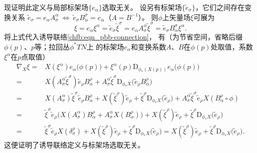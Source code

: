 现证明此定义与局部标架场$\{e_\alpha\}$选取无关。
设另有标架场$\{\tilde{e}_{\sigma}\}$，它们之间存在变换关系
$\tilde{e}_\sigma= e_\alpha A^\alpha_{\sigma} {\  \Leftrightarrow\  }
\tilde{e}_\sigma B_{\alpha}^\sigma  = e_\alpha$（$A=B^{-1}$）。
则$\phi$上矢量场$\xi$可展为
\begin{equation}
    \xi = e_\alpha \xi^\alpha = \tilde{e}_\sigma \tilde{\xi}^\sigma
    = e_\alpha A^\alpha_{\sigma} \tilde{\xi}^\sigma
    = \tilde{e}_\sigma B_{\alpha}^\sigma \xi^\alpha .
\end{equation}
将上式代入诱导联络\eqref{chfb:eqn_pbb-connection}，
有（为节省空间，省略后缀$\phi(p)$、$p$等；拉回丛$\phi^*TN$上
的标架场$e_\alpha$和变换系数$A$、$B$在$\phi(p)$处取值，系数$\xi^\alpha$在$p$点取值）
\begin{align*}
    \nabla_X \xi =& X(\xi^\alpha ) e_\alpha\bigl(\phi(p)\bigr)
    +\xi^\alpha(p) \mathrm{D}_{\phi_*(X(p))} e_\alpha\bigl(\phi(p)\bigr) \\
    =& X\left(A^\alpha_{\sigma} \tilde{\xi}^\sigma \right)
    \tilde{e}_\rho B_{\alpha}^\rho
    + A^\alpha_{\sigma} \tilde{\xi}^\sigma
    \mathrm{D}_{\phi_*X} \bigl(\tilde{e}_\rho B_{\alpha}^\rho\bigr) \\
    =& X\left(A^\alpha_{\sigma}  \right) \tilde{\xi}^\sigma
    \tilde{e}_\rho B_{\alpha}^\rho
    + X ( \tilde{\xi}^\rho ) \tilde{e}_\rho
    +  \tilde{\xi}^\rho  \mathrm{D}_{\phi_*X} \bigl(\tilde{e}_\rho \bigr)
    + A^\alpha_{\sigma} \tilde{\xi}^\sigma \tilde{e}_\rho
    X( B_{\alpha}^\rho \circ \phi ) \\
    =& \tilde{\xi}^\sigma \tilde{e}_\rho \bigl(
    X(A^\alpha_{\sigma}  ) B_{\alpha}^\rho
    + A^\alpha_{\sigma} X( B_{\alpha}^\rho ) \bigr)
    + X ( \tilde{\xi}^\rho ) \tilde{e}_\rho
    +  \tilde{\xi}^\rho  \mathrm{D}_{\phi_*X} \bigl(\tilde{e}_\rho \bigr)   \\
    =& \tilde{\xi}^\sigma \tilde{e}_\rho  X( \delta^\rho_\sigma )+
    X ( \tilde{\xi}^\rho ) \tilde{e}_\rho
    +  \tilde{\xi}^\rho  \mathrm{D}_{\phi_*X} \bigl(\tilde{e}_\rho \bigr)
    =X ( \tilde{\xi}^\rho ) \tilde{e}_\rho
    +  \tilde{\xi}^\rho  \mathrm{D}_{\phi_*X} \bigl(\tilde{e}_\rho \bigr) .
\end{align*}
这便证明了诱导联络定义与标架场选取无关。


